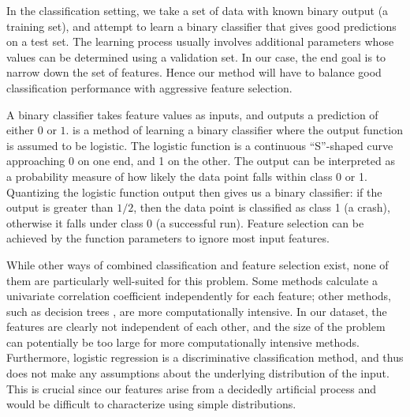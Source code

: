 In the classification setting, we take a set of data with known binary
output (a training set), and attempt to learn a binary classifier that
gives good predictions on a test set.  The learning process usually
involves additional parameters whose values can be determined using a
validation set.  In our case, the end goal is to narrow down the set
of features.  Hence our method will have to balance good
classification performance with aggressive feature selection.

A binary classifier takes feature values as inputs, and outputs a
prediction of either $0$ or $1$.  
\cite{Hastie01} is a method of learning a binary classifier where the
output function is assumed to be logistic.  The logistic function is a
continuous ``S''-shaped curve approaching 0 on one end, and 1 on the
other.  The output can be interpreted as a probability measure of how
likely the data point falls within class 0 or 1.  Quantizing the
logistic function output then gives us a binary classifier: if the
output is greater than $1/2$, then the data point is classified as
class 1 (a crash), otherwise it falls under class 0 (a successful
run).  Feature selection can be achieved by  the
function parameters to ignore most input features.


While other ways of combined classification and feature selection
exist, none of them are particularly well-suited for this problem.
Some methods \cite{Golub:MCC:1999,Tibshirani2002} calculate a
univariate correlation coefficient independently for each feature;
other methods, such as decision trees \cite{00000048}, are more
computationally intensive.  In our dataset, the features are clearly
not independent of each other, and the size of the problem can
potentially be too large for more computationally intensive methods.
Furthermore, logistic regression is a discriminative classification
method, and thus does not make any assumptions about the underlying
distribution of the input.  This is crucial since our features arise
from a decidedly artificial process and would be difficult to
characterize using simple distributions.

